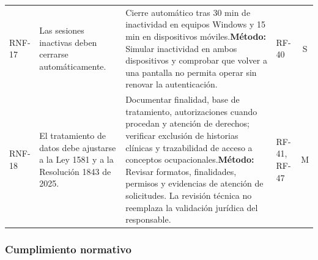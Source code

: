 \documentclass[12pt,letterpaper]{article}
\begin{document}
{\begin{longtable}{@{}L{1.8cm} L{4.65cm} L{4.75cm} L{2.1cm} c@{}}
RNF-17 & Las sesiones inactivas deben cerrarse automáticamente. & Cierre automático tras 30 min de inactividad en equipos Windows y 15 min en dispositivos móviles.\newline \textbf{Método:} Simular inactividad en ambos dispositivos y comprobar que volver a una pantalla no permita operar sin renovar la autenticación. & RF-40 & S \\
RNF-18 & El tratamiento de datos debe ajustarse a la Ley 1581 y a la Resolución 1843 de 2025. & Documentar finalidad, base de tratamiento, autorizaciones cuando procedan y atención de derechos; verificar exclusión de historias clínicas y trazabilidad de acceso a conceptos ocupacionales.\newline \textbf{Método:} Revisar formatos, finalidades, permisos y evidencias de atención de solicitudes. La revisión técnica no reemplaza la validación jurídica del responsable. & RF-41, RF-47 & M \\
\end{longtable}
}

\subsubsection{Cumplimiento normativo}
\end{document}
